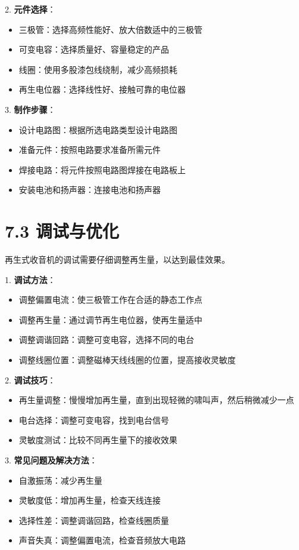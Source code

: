 \documentclass[12pt,UTF8]{ctexbook}
\begin{document}
2. \textbf{元件选择}：
   \begin{itemize}[leftmargin=3.5em]
   \item 三极管：选择高频性能好、放大倍数适中的三极管
   \item 可变电容：选择质量好、容量稳定的产品
   \item 线圈：使用多股漆包线绕制，减少高频损耗
   \item 再生电位器：选择线性好、接触可靠的电位器
   \end{itemize}

3. \textbf{制作步骤}：
   \begin{itemize}[leftmargin=3.5em]
   \item 设计电路图：根据所选电路类型设计电路图
   \item 准备元件：按照电路要求准备所需元件
   \item 焊接电路：将元件按照电路图焊接在电路板上
   \item 安装电池和扬声器：连接电池和扬声器
   \end{itemize}

\section*{7.3 调试与优化}

再生式收音机的调试需要仔细调整再生量，以达到最佳效果。

1. \textbf{调试方法}：
   \begin{itemize}[leftmargin=3.5em]
   \item 调整偏置电流：使三极管工作在合适的静态工作点
   \item 调整再生量：通过调节再生电位器，使再生量适中
   \item 调整调谐回路：调整可变电容，选择不同的电台
   \item 调整线圈位置：调整磁棒天线线圈的位置，提高接收灵敏度
   \end{itemize}

2. \textbf{调试技巧}：
   \begin{itemize}[leftmargin=3.5em]
   \item 再生量调整：慢慢增加再生量，直到出现轻微的啸叫声，然后稍微减少一点
   \item 电台选择：调整可变电容，找到电台信号
   \item 灵敏度测试：比较不同再生量下的接收效果
   \end{itemize}

3. \textbf{常见问题及解决方法}：
   \begin{itemize}[leftmargin=3.5em]
   \item 自激振荡：减少再生量
   \item 灵敏度低：增加再生量，检查天线连接
   \item 选择性差：调整调谐回路，检查线圈质量
   \item 声音失真：调整偏置电流，检查音频放大电路
   \end{itemize}
\end{document}
